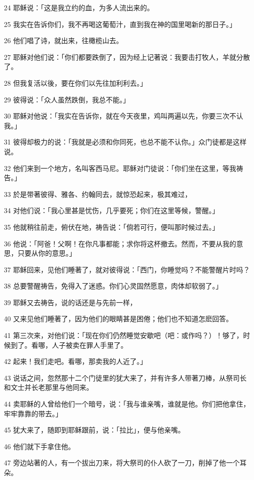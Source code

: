\par 24 耶稣说：「这是我立约的血，为多人流出来的。
\par 25 我实在告诉你们，我不再喝这葡萄汁，直到我在神的国里喝新的那日子。」
\par 26 他们唱了诗，就出来，往橄榄山去。
\par 27 耶稣对他们说：「你们都要跌倒了，因为经上记著说：我要击打牧人，羊就分散了。
\par 28 但我复活以後，要在你们以先往加利利去。」
\par 29 彼得说：「众人虽然跌倒，我总不能。」
\par 30 耶稣对他说：「我实在告诉你，就在今天夜里，鸡叫两遍以先，你要三次不认我。」
\par 31 彼得却极力的说：「我就是必须和你同死，也总不能不认你。」众门徒都是这样说。
\par 32 他们来到一个地方，名叫客西马尼。耶稣对门徒说：「你们坐在这里，等我祷告。」
\par 33 於是带著彼得、雅各、约翰同去，就惊恐起来，极其难过，
\par 34 对他们说：「我心里甚是忧伤，几乎要死；你们在这里等候，警醒。」
\par 35 他就稍往前走，俯伏在地，祷告说：「倘若可行，便叫那时候过去。」
\par 36 他说：「阿爸！父啊！在你凡事都能；求你将这杯撤去。然而，不要从我的意思，只要从你的意思。」
\par 37 耶稣回来，见他们睡著了，就对彼得说：「西门，你睡觉吗？不能警醒片时吗？
\par 38 总要警醒祷告，免得入了迷惑。你们心灵固然愿意，肉体却软弱了。」
\par 39 耶稣又去祷告，说的话还是与先前一样，
\par 40 又来见他们睡著了，因为他们的眼睛甚是困倦；他们也不知道怎麽回答。
\par 41 第三次来，对他们说：「现在你们仍然睡觉安歇吧（吧：或作吗？）！够了，时候到了。看哪，人子被卖在罪人手里了。
\par 42 起来！我们走吧。看哪，那卖我的人近了。」
\par 43 说话之间，忽然那十二个门徒里的犹大来了，并有许多人带著刀棒，从祭司长和文士并长老那里与他同来。
\par 44 卖耶稣的人曾给他们一个暗号，说：「我与谁亲嘴，谁就是他。你们把他拿住，牢牢靠靠的带去。」
\par 45 犹大来了，随即到耶稣跟前，说：「拉比」，便与他亲嘴。
\par 46 他们就下手拿住他。
\par 47 旁边站著的人，有一个拔出刀来，将大祭司的仆人砍了一刀，削掉了他一个耳朵。
